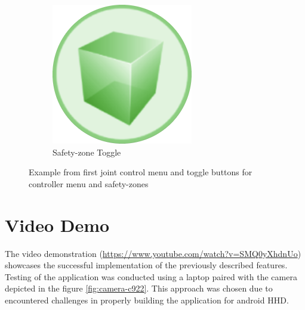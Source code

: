 \begin{figure}[h]
\begin{subfigure}[b]{0.31\textwidth}
                \centering
                \includegraphics[width=0.3\linewidth]{figs/unclick_sz.png}
                \caption{Safety-zone Toggle}
                \label{fig:toggle-safety}
            \end{subfigure}
            \caption{Example from first joint control menu and toggle buttons for controller menu and safety-zones}
            \label{fig:joint-toggle}
            \end{figure}
        
\section{Video Demo}
    The video demonstration (\href{https://www.youtube.com/watch?v=SMQ0yXhdnUo}{https://www.youtube.com/watch?v=SMQ0yXhdnUo}) showcases 
    the successful implementation of the previously described features. Testing of the application was conducted using a laptop paired
     with the camera depicted in the figure \ref{fig:camera-c922}. This approach was chosen due to encountered challenges in properly
      building the application for android \ac{HHD}.
            